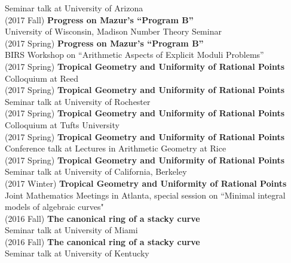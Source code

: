 \documentclass[margin,line]{res}
\begin{document}
\begin{resume}
Seminar talk at University of Arizona
\vspace{.05cm}\\
(2017 Fall) \textbf{Progress on Mazur's ``Program B''}\\  
University of Wisconsin, Madison Number Theory Seminar
\vspace{.05cm}\\
(2017 Spring) \textbf{Progress on Mazur's ``Program B''}\\  
BIRS Workshop on ``Arithmetic Aspects of Explicit Moduli Problems''
\vspace{.05cm}\\
(2017 Spring) \textbf{Tropical Geometry and Uniformity of Rational Points}\\
Colloquium at Reed 
\vspace{.05cm}\\
(2017 Spring) \textbf{Tropical Geometry and Uniformity of Rational Points}\\
Seminar talk at University of Rochester
\vspace{.05cm}\\
(2017 Spring) \textbf{Tropical Geometry and Uniformity of Rational Points}\\
Colloquium at Tufts University 
\vspace{.05cm}\\
(2017 Spring) \textbf{Tropical Geometry and Uniformity of Rational Points}\\
Conference talk at Lectures in Arithmetic Geometry at Rice
\vspace{.05cm}\\
(2017 Spring) \textbf{Tropical Geometry and Uniformity of Rational Points}\\
Seminar talk at University of California, Berkeley
\vspace{.05cm}\\
(2017 Winter) \textbf{Tropical Geometry and Uniformity of Rational Points}\\
Joint Mathematics Meetings in Atlanta, special session on ``Minimal integral models of algebraic curves"  
\vspace{.05cm}\\
(2016 Fall) \textbf{The canonical ring of a stacky curve}\\  
Seminar talk at University of Miami
\vspace{.05cm}\\
(2016 Fall) \textbf{The canonical ring of a stacky curve}\\  
Seminar talk at University of Kentucky

\end{resume}
\end{document}
